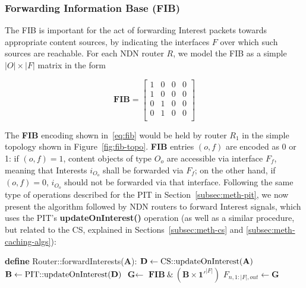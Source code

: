 \subsubsection{Forwarding Information Base (FIB)}
\label{subsec:meth-fib}

The FIB is important for the act of forwarding Interest packets towards 
appropriate content sources, by indicating the interfaces $F$ over which such 
sources are reachable. For each NDN router $R$, we model the FIB as a simple 
$|O| \times |F|$ matrix in the form

\begin{equation}
\textbf{FIB} = \begin{bmatrix} 1 & 0 & 0 & 0  \\ 
                1 & 0 & 0 & 0               \\ 
                0 & 1 & 0 & 0               \\ 
                0 & 1 & 0 & 0               \\ \end{bmatrix}
    \label{eq:fib}
\end{equation}\shortvertbreak

The \textbf{FIB} encoding shown in~\ref{eq:fib} would be held by router $R_1$ in the 
simple topology shown in Figure~\ref{fig:fib-topo}. \textbf{FIB} entries 
$(o,f)$ are encoded as 0 or 1: if $(o,f) = 1$, content objects of 
type $O_o$ are accessible via interface $F_f$, meaning that Interests 
$i_{O_o}$ shall be forwarded via $F_f$; on the other hand, 
if $(o,f) = 0$, $i_{O_o}$ should not be forwarded via that interface. 
Following the same type of operations described for the PIT 
in Section~\ref{subsec:meth-pit}, we now present the algorithm followed by NDN 
routers to forward Interest signals, which uses the PIT's 
\textbf{updateOnInterest()} operation (as well as a similar procedure, but 
related to the CS, explained in Sections~\ref{subsec:meth-cs} and 
\ref{subsec:meth-caching-algs}):\shortvertbreak 

\begin{algorithmic}[1]

\State \textbf{define} Router::forwardInterests($\textbf{A}$):
\State
    \State $\textbf{D} \leftarrow \text{CS::updateOnInterest(\textbf{A})}$
    \State $\textbf{B} \leftarrow \text{PIT::updateOnInterest(\textbf{D})}$
    \State $\textbf{G} \leftarrow$ $\textbf{FIB} \ \& \ (\textbf{B} \times \textbf{1}'^{|F|})$
    \State $F_{n,1:|F|,out} \leftarrow \textbf{G}$

\end{algorithmic}\shortvertbreak

